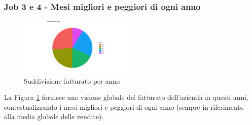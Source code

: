 \subsubsection{Job 3 e 4 - Mesi migliori e peggiori di ogni anno}
\begin{figure}
    \centering
    \includegraphics[width=0.5\textwidth]{img/fatturato per anno.png}
    \caption{Suddivisione fatturato per anno}
    \label{figure:fatturatoAnno}
\end{figure}

La Figura \ref{figure:fatturatoAnno} fornisce una visione globale del fatturato dell'azienda in questi anni, contestualizzando i mesi migliori e peggiori di ogni anno (sempre in riferimento alla media globale delle vendite).


